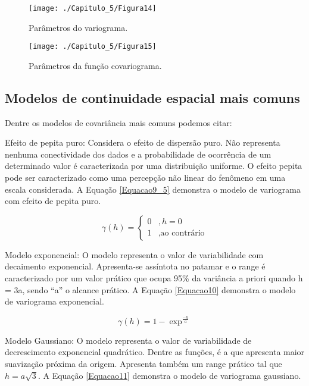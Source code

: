 \begin{figure}[H]
	\centering
	\texttt{[image: ./Capitulo\_5/Figura14]}
	\caption{Parâmetros do variograma.}
	\label{Figura14}
\end{figure}

\begin{figure}[H]
	\centering
	\texttt{[image: ./Capitulo\_5/Figura15]}
	\caption{Parâmetros da função covariograma.}
	\label{Figura15}
\end{figure}

\subsection{Modelos de continuidade espacial mais comuns}

Dentre os modelos de covariância mais comuns podemos citar: 

Efeito de pepita puro: Considera o efeito de dispersão puro. Não representa nenhuma conectividade dos dados e a probabilidade de ocorrência de um determinado valor é caracterizada por uma distribuição uniforme. O efeito pepita pode ser caracterizado como uma percepção não linear do fenômeno em uma escala considerada. A Equação \ref{Equacao9_5} demonstra o modelo de variograma com efeito de pepita puro.

\begin{equation}\label{Equacao9_5}
\gamma(h) = \begin{cases}
0 & , h =0 \\
1 &,\text{ao contrário}
\end{cases}
\end{equation}


Modelo exponencial: O modelo representa o valor de variabilidade com decaimento exponencial. Apresenta-se assíntota no patamar e o range é caracterizado por um valor prático que ocupa 95\% da variância a priori quando h = 3a, sendo “a” o alcance prático. A Equação \ref{Equacao10} demonstra o modelo de variograma exponencial.

\begin{equation}\label{Equacao10}
\gamma(h) = 1 - \exp^{\frac{-h}{a}}
\end{equation}

Modelo Gaussiano: O modelo representa o valor de variabilidade de decrescimento exponencial quadrático. Dentre as funções, é a que apresenta maior suavização próxima da origem. Apresenta também um range prático tal que $h=a\sqrt{3}$. A Equação \ref{Equacao11} demonstra o modelo de variograma gaussiano.

